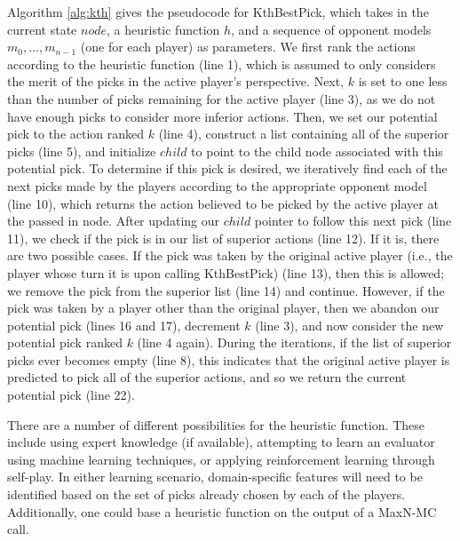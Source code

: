 \documentclass[letterpaper]{article}
\numberwithin{equation}{section}
\numberwithin{theorem}{section}
\numberwithin{lemma}{section}
\numberwithin{df}{section}
\begin{document}
Algorithm \ref{alg:kth} gives the pseudocode for KthBestPick, which takes in the current state $node$, a heuristic function $h$, and a sequence of opponent models $m_0, ..., m_{n-1}$ (one for each player) as parameters.  We first rank the actions according to the heuristic function (line 1), which is assumed to only considers the merit of the picks in the active player's perspective.  Next, $k$ is set to one less than the number of picks remaining for the active player (line 3), as we do not have enough picks to consider more inferior actions.  Then, we set our potential pick to the action ranked $k$ (line 4), construct a list containing all of the superior picks (line 5), and initialize $child$ to point to the child node associated with this potential pick.  To determine if this pick is desired, we iteratively find each of the next picks made by the players according to the appropriate opponent model (line 10), which returns the action believed to be picked by the active player at the passed in node.  After updating our $child$ pointer to follow this next pick (line 11), we check if the pick is in our list of superior actions (line 12).  If it is, there are two possible cases.  If the pick was taken by the original active player (i.e., the player whose turn it is upon calling KthBestPick) (line 13), then this is allowed; we remove the pick from the superior list (line 14) and continue.  However, if the pick was taken by a player other than the original player, then we abandon our potential pick (lines 16 and 17), decrement $k$ (line 3), and now consider the new potential pick ranked $k$ (line 4 again).  During the iterations, if the list of superior picks ever becomes empty (line 8), this indicates that the original active player is predicted to pick all of the superior actions, and so we return the current potential pick (line 22).

There are a number of different possibilities for the heuristic function.  These include using expert knowledge (if available), attempting to learn an evaluator using machine learning techniques, or applying reinforcement learning through self-play.  In either learning scenario, domain-specific features will need to be identified based on the set of picks already chosen by each of the players.  Additionally, one could base a heuristic function on the output of a MaxN-MC call.
\end{document}
